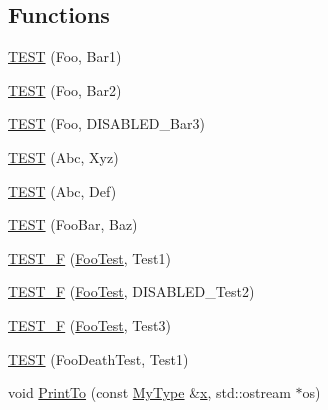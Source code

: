 \subsection*{Functions}
\begin{DoxyCompactItemize}
\item 
\mbox{\hyperlink{googletest-master_2googletest_2test_2googletest-list-tests-unittest___8cc_a1f94d1d04b3e17e0c656f67c43dcd245}{T\+E\+ST}} (Foo, Bar1)
\item 
\mbox{\hyperlink{googletest-master_2googletest_2test_2googletest-list-tests-unittest___8cc_aff0f7cd627da403d28ffe872aec2c8dd}{T\+E\+ST}} (Foo, Bar2)
\item 
\mbox{\hyperlink{googletest-master_2googletest_2test_2googletest-list-tests-unittest___8cc_a0defa1e8ea8c596e9b1ff68e079ac36e}{T\+E\+ST}} (Foo, D\+I\+S\+A\+B\+L\+E\+D\+\_\+\+Bar3)
\item 
\mbox{\hyperlink{googletest-master_2googletest_2test_2googletest-list-tests-unittest___8cc_aea722cccf3017f3cc6aa445ef3062c6b}{T\+E\+ST}} (Abc, Xyz)
\item 
\mbox{\hyperlink{googletest-master_2googletest_2test_2googletest-list-tests-unittest___8cc_a424455aa813a24d05f74ba04cff13167}{T\+E\+ST}} (Abc, Def)
\item 
\mbox{\hyperlink{googletest-master_2googletest_2test_2googletest-list-tests-unittest___8cc_a0c5a078c78b95b153badeea154f57abf}{T\+E\+ST}} (Foo\+Bar, Baz)
\item 
\mbox{\hyperlink{googletest-master_2googletest_2test_2googletest-list-tests-unittest___8cc_abdf83273b95cab0385a014eaa9194380}{T\+E\+S\+T\+\_\+F}} (\mbox{\hyperlink{class_foo_test}{Foo\+Test}}, Test1)
\item 
\mbox{\hyperlink{googletest-master_2googletest_2test_2googletest-list-tests-unittest___8cc_a5fa72d1c454dc7b30f5dbe06926f70d1}{T\+E\+S\+T\+\_\+F}} (\mbox{\hyperlink{class_foo_test}{Foo\+Test}}, D\+I\+S\+A\+B\+L\+E\+D\+\_\+\+Test2)
\item 
\mbox{\hyperlink{googletest-master_2googletest_2test_2googletest-list-tests-unittest___8cc_a689d13a3da3c5eecd3eba3c512713a12}{T\+E\+S\+T\+\_\+F}} (\mbox{\hyperlink{class_foo_test}{Foo\+Test}}, Test3)
\item 
\mbox{\hyperlink{googletest-master_2googletest_2test_2googletest-list-tests-unittest___8cc_acfc50868d2ae644150744ddd74b542f1}{T\+E\+ST}} (Foo\+Death\+Test, Test1)
\item 
void \mbox{\hyperlink{googletest-master_2googletest_2test_2googletest-list-tests-unittest___8cc_aaf76f8f336db1c295fe3aa914c4c6182}{Print\+To}} (const \mbox{\hyperlink{class_my_type}{My\+Type}} \&\mbox{\hyperlink{_obj__test_2lib_2googletest-master_2googlemock_2test_2gmock-matchers__test_8cc_a6150e0515f7202e2fb518f7206ed97dc}{x}}, std\+::ostream $\ast$os)

\end{DoxyCompactItemize}
